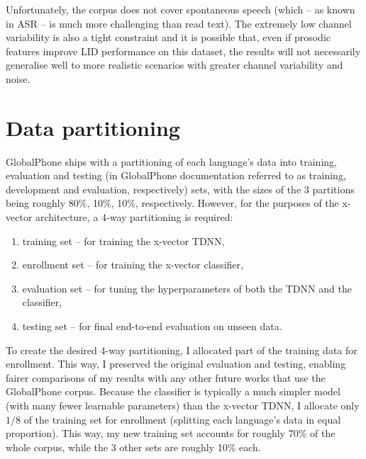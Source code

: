 \documentclass[bsc,frontabs,twoside,singlespacing,parskip,deptreport]{infthesis}
\begin{document}
{{    %
    Unfortunately, the corpus does not cover spontaneous speech (which -- as known in ASR -- is much more challenging than read text). The extremely low channel variability is also a tight constraint and it is possible that, even if prosodic features improve LID performance on this dataset, the results will not necessarily generalise well to more realistic scenarios with greater channel variability and noise.    
  }

  \section{Data partitioning}{
    \label{sec:partitioning}
    GlobalPhone ships with a partitioning of each language's data into training, evaluation and testing (in GlobalPhone documentation referred to as training, development and evaluation, respectively) sets, with the sizes of the 3 partitions being roughly 80\%, 10\%, 10\%, respectively. However, for the purposes of the x-vector architecture, a 4-way partitioning is required:
    \begin{enumerate}
      \item{training set -- for training the x-vector TDNN,}
      \item{enrollment set -- for training the x-vector classifier,}
      \item{evaluation set -- for tuning the hyperparameters of both the TDNN and the classifier,}
      \item{testing set -- for final end-to-end evaluation on unseen data.}
    \end{enumerate}

    To create the desired 4-way partitioning, I allocated part of the training data for enrollment. This way, I preserved the original evaluation and testing, enabling fairer comparisons of my results with any other future works that use the GlobalPhone corpus.
    Because the classifier is typically a much simpler model (with many fewer learnable parameters) than the x-vector TDNN, I allocate only $1/8$ of the training set for enrollment (splitting each language's data in equal proportion). This way, my new training set accounts for roughly 70\% of the whole corpus, while the 3 other sets are roughly 10\% each.

}}
\end{document}
